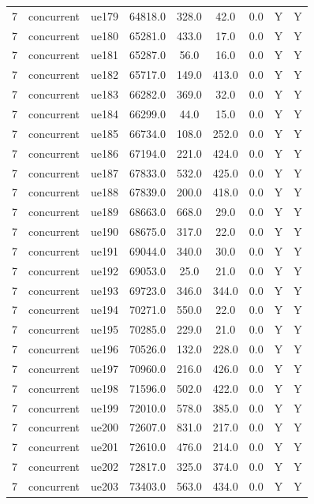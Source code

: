 \begin{table}[ht]
\begin{tabular}{|c|c|c|c|c|c|c|c|c|}
7 & concurrent & ue179 & 64818.0 & 328.0 & 42.0 & 0.0 & Y & Y \\
7 & concurrent & ue180 & 65281.0 & 433.0 & 17.0 & 0.0 & Y & Y \\
7 & concurrent & ue181 & 65287.0 & 56.0 & 16.0 & 0.0 & Y & Y \\
7 & concurrent & ue182 & 65717.0 & 149.0 & 413.0 & 0.0 & Y & Y \\
7 & concurrent & ue183 & 66282.0 & 369.0 & 32.0 & 0.0 & Y & Y \\
7 & concurrent & ue184 & 66299.0 & 44.0 & 15.0 & 0.0 & Y & Y \\
7 & concurrent & ue185 & 66734.0 & 108.0 & 252.0 & 0.0 & Y & Y \\
7 & concurrent & ue186 & 67194.0 & 221.0 & 424.0 & 0.0 & Y & Y \\
7 & concurrent & ue187 & 67833.0 & 532.0 & 425.0 & 0.0 & Y & Y \\
7 & concurrent & ue188 & 67839.0 & 200.0 & 418.0 & 0.0 & Y & Y \\
7 & concurrent & ue189 & 68663.0 & 668.0 & 29.0 & 0.0 & Y & Y \\
7 & concurrent & ue190 & 68675.0 & 317.0 & 22.0 & 0.0 & Y & Y \\
7 & concurrent & ue191 & 69044.0 & 340.0 & 30.0 & 0.0 & Y & Y \\
7 & concurrent & ue192 & 69053.0 & 25.0 & 21.0 & 0.0 & Y & Y \\
7 & concurrent & ue193 & 69723.0 & 346.0 & 344.0 & 0.0 & Y & Y \\
7 & concurrent & ue194 & 70271.0 & 550.0 & 22.0 & 0.0 & Y & Y \\
7 & concurrent & ue195 & 70285.0 & 229.0 & 21.0 & 0.0 & Y & Y \\
7 & concurrent & ue196 & 70526.0 & 132.0 & 228.0 & 0.0 & Y & Y \\
7 & concurrent & ue197 & 70960.0 & 216.0 & 426.0 & 0.0 & Y & Y \\
7 & concurrent & ue198 & 71596.0 & 502.0 & 422.0 & 0.0 & Y & Y \\
7 & concurrent & ue199 & 72010.0 & 578.0 & 385.0 & 0.0 & Y & Y \\
7 & concurrent & ue200 & 72607.0 & 831.0 & 217.0 & 0.0 & Y & Y \\
7 & concurrent & ue201 & 72610.0 & 476.0 & 214.0 & 0.0 & Y & Y \\
7 & concurrent & ue202 & 72817.0 & 325.0 & 374.0 & 0.0 & Y & Y \\
7 & concurrent & ue203 & 73403.0 & 563.0 & 434.0 & 0.0 & Y & Y \\

\end{tabular}
\end{table}
